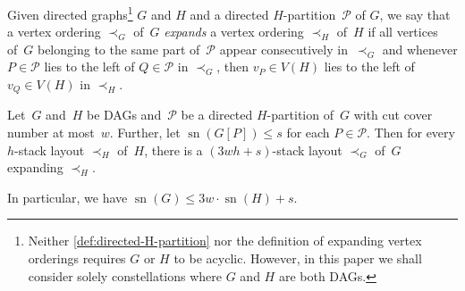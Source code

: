 \documentclass{article}
\DeclareMathOperator{\sn}{sn}
\newcommand{\calP}{\ensuremath{\mathcal{P}}\xspace}
\newcommand{\Hpartition}{$H$\nobreakdash-partition\xspace}
\begin{document}
\newpage%
Given directed graphs\footnote{Neither \cref{def:directed-H-partition} nor the definition of expanding vertex orderings requires $G$ or $H$ to be acyclic. However, in this paper we shall consider solely constellations where $G$ and $H$ are both DAGs.} $G$ and $H$ and a directed \Hpartition~$\calP$ of $G$, we say that a vertex ordering $\prec_G$ of~$G$ \emph{expands} a vertex ordering $\prec_H$ of~$H$ if all vertices of~$G$ belonging to the same part of~$\calP$ appear consecutively in~$\prec_G$ and whenever $P \in \calP$ lies to the left of $Q \in \calP$ in $\prec_G$, then $v_P \in V(H)$ lies to the left of $v_Q \in V(H)$ in $\prec_H$.

\begin{lemma}
\label{lem:bounded_H_partition_to_stack_layout}
    Let~$G$ and~$H$ be DAGs and~\calP be a directed \Hpartition of~$G$ with cut cover number at most~$w$.
    Further, let $\sn(G[P]) \leq s$ for each $P \in \calP$.
    Then for every $h$-stack layout $\prec_H$ of~$H$, there is a $(3wh + s)$-stack layout $\prec_G$ of~$G$ expanding $\prec_H$.
    
    In particular, we have $\sn(G) \leq 3w \cdot \sn(H) + s$.    
\end{lemma}
\end{document}
